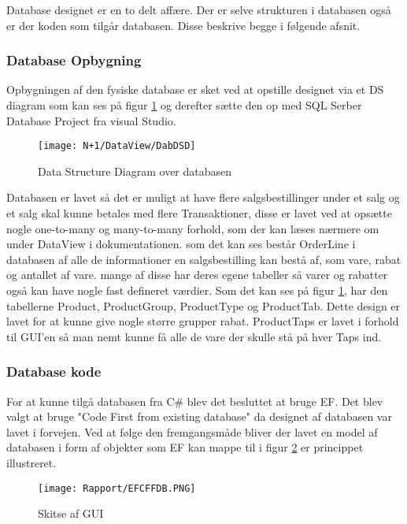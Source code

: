 Database designet er en to delt affære. Der er selve strukturen i databasen også er der koden som tilgår databasen.
Disse beskrive begge i følgende afsnit.

\subsubsection{Database Opbygning}
Opbygningen af den fysiske database er sket ved at opstille designet via et DS diagram som kan ses på figur \ref{fig:DSD} og derefter sætte den op med SQL Serber Database Project fra visual Studio. 

\begin{figure}[H]
    \centering
    \texttt{[image: N+1/DataView/DabDSD]}
    \caption{Data Structure Diagram over databasen}
    \label{fig:DSD}
\end{figure}
Databasen er lavet så det er muligt at have flere salgsbestillinger under et salg og et salg skal kunne betales med flere Transaktioner, disse er lavet ved at opsætte nogle one-to-many og many-to-many forhold, som der kan læses nærmere om under DataView i dokumentationen.
\newline
\newline
som det kan ses består OrderLine i databasen af alle de informationer en salgsbestilling kan bestå af, som vare, rabat og antallet af vare. mange af disse har deres egene tabeller så varer og rabatter også kan have nogle fast defineret værdier.
\newline
\newline
Som det kan ses på figur \ref{fig:DSD}, har den tabellerne Product, ProductGroup, ProductType og ProductTab. Dette design er lavet for at kunne give nogle større grupper rabat. ProductTaps er lavet i forhold til GUI'en så man nemt kunne få alle de vare der skulle stå på hver Taps ind.  


\subsubsection{Database kode}
For at kunne tilgå databasen fra C\# blev det besluttet at bruge \gls{EF}. 
Det blev valgt at bruge "Code First from existing database" da designet af databasen var lavet i forvejen.
Ved at følge den fremgangsmåde bliver der lavet en model af databasen i form af objekter som \gls{EF} 
kan mappe til i figur \ref{fig:CodeFirstFromDB} er princippet illustreret.

\begin{figure}[H]
    \centering
	\texttt{[image: Rapport/EFCFFDB.PNG]}
	\caption{Skitse af GUI}
	\label{fig:CodeFirstFromDB}
\end{figure} 

